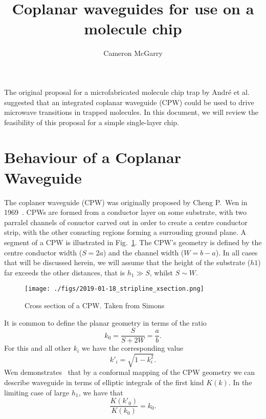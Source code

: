 \documentclass[a4paper]{article}
\title{Coplanar waveguides for use on a molecule chip}
\author{Cameron McGarry}
\begin{document}
\maketitle

The original proposal for a microfabricated molecule chip trap by Andr\'e et
al.~\cite{Andre2006} suggested that an integrated coplanar waveguide (CPW) could
be used to drive microwave transitions in trapped molecules. In this document,
we will review the feasibility of this proposal for a simple single-layer chip.

\section{Behaviour of a Coplanar Waveguide}

The coplaner waveguide (CPW) was originally proposed by Cheng P.~Wen in
1969~\cite{1127105}. CPWs are formed from a conductor layer on some substrate,
with two parralel channels of conuctor carved out in order to create a centre
conductor strip, with the other conucting regions forming a surrouding ground
plane. A segment of a CPW is illustrated in Fig.~\ref{fig:CPWxsec}. The
CPW's geometry is defined by the centre conductor width ($S=2a$) and the channel
width ($W=b-a$). In all cases that will be discussed herein, we will assume that
the height of the substrate ($h1$) far exceeds the other distances, that is $h_1
\gg S$, whilst $S \sim W$.

\begin{figure}
  \texttt{[image: ./figs/2019-01-18\_stripline\_xsection.png]}
  \caption{Cross section of a CPW. Taken from Simons~\cite{Simons2004}}
  \label{fig:CPWxsec}
\end{figure}

It is common to define the planar geometry in terms of the
ratio~\cite{1127105, Simons2004}
\begin{equation}
  k_0 = \frac{S}{S+2W} = \frac{a}{b}.
  \label{eqn:k0def}
\end{equation}
For this and all other $k_i$ we have the corresponding value
\begin{equation}
  k'_i = \sqrt{1-k^2_i}.
\end{equation}
Wen demonstrates~\cite{1127105} that by a conformal mapping of the CPW geometry
we can describe waveguide in terms of elliptic integrals of the first kind
$K(k)$. In the limiting case of large $h_1$, we have that
\begin{equation}
  \frac{K(k'_0)}{K(k_0)} = k_0.
  \label{eqn:k0rat}
\end{equation}
\end{document}
